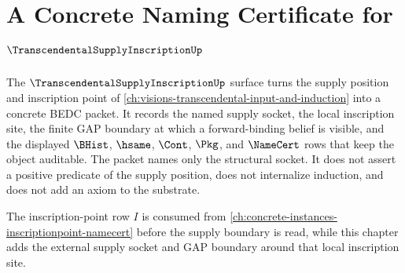 \chapter{A Concrete Naming Certificate for $\TranscendentalSupplyInscriptionUp$}
\label{ch:concrete-instances-transcendentalsupplyinscription-namecert}

The $\TranscendentalSupplyInscriptionUp$ surface turns the supply position and inscription point of \autoref{ch:visions-transcendental-input-and-induction} into a concrete BEDC packet. It records the named supply socket, the local inscription site, the finite GAP boundary at which a forward-binding belief is visible, and the displayed $\BHist$, $\hsame$, $\Cont$, $\Pkg$, and $\NameCert$ rows that keep the object auditable. The packet names only the structural socket. It does not assert a positive predicate of the supply position, does not internalize induction, and does not add an axiom to the substrate.

The inscription-point row $I$ is consumed from \autoref{ch:concrete-instances-inscriptionpoint-namecert} before the supply boundary is read, while this chapter adds the external supply socket and GAP boundary around that local inscription site.

